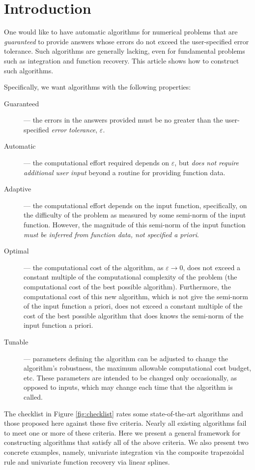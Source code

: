\documentclass[]{elsarticle}
\theoremstyle{definition}
\theoremstyle{remark}
\begin{document}
\section{Introduction}

One would like to have automatic algorithms for numerical problems that are \emph{guaranteed} to provide answers whose errors do not exceed the user-specified error tolerance.  Such algorithms are generally lacking, even for fundamental problems such as integration and function recovery.  This article shows how to construct such algorithms.

Specifically, we want algorithms with the following properties:
\begin{description}
\item[Guaranteed]--- the errors in the answers provided must be no greater than the user-specified \emph{error tolerance}, $\varepsilon$.
\item[Automatic]--- the computational effort required depends on $\varepsilon$, but \emph{does not require additional user input} beyond a routine for providing function data.
\item[Adaptive]--- the computational effort depends on the input function, specifically, on the difficulty of the problem as measured by some semi-norm of the input function.  However, the magnitude of this semi-norm of the input function \emph{must be inferred from function data, not specified a priori}.
\item[Optimal]--- the computational cost of the algorithm, as $\varepsilon \to 0$, does not exceed a constant multiple of the computational complexity of the problem (the computational cost of the best possible algorithm).  Furthermore, the computational cost of this new algorithm, which is not give the semi-norm of the input function a priori, does not exceed a constant multiple of the cost of the best possible algorithm that does knows the semi-norm of the input function a priori.
\item[Tunable]--- parameters defining the algorithm can be adjusted to change the algorithm's robustness, the maximum allowable computational cost budget, etc.  These parameters are intended to be changed only occasionally, as opposed to inputs, which may change each time that the algorithm is called.
\end{description}
The checklist in Figure \ref{fig:checklist} rates some state-of-the-art algorithms and those proposed here against these five criteria.  Nearly all existing algorithms fail to meet one or more of these criteria.  Here we present a general framework for constructing algorithms that satisfy all of the above criteria.  We also present two concrete examples, namely, univariate integration via the composite trapezoidal rule and univariate function recovery via linear splines.
\end{document}
